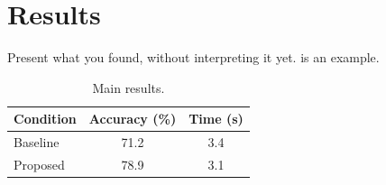 \chapter{Results}
\label{ch:results}

Present what you found, without interpreting it yet. 
is an example.

\begin{table}[htbp]
  \centering
  \caption{Main results.}
  \label{tab:results}
  \begin{tabular}{lcc}
    \toprule
    Condition & Accuracy (\%) & Time (s) \\
    \midrule
    Baseline  & 71.2 & 3.4 \\
    Proposed  & 78.9 & 3.1 \\
    \bottomrule
  \end{tabular}
\end{table}
